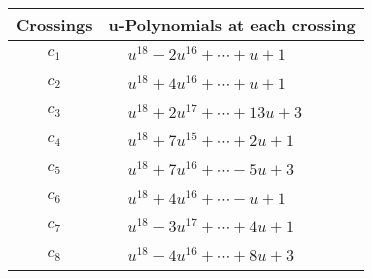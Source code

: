 \documentclass[1p]{elsarticle_modified}
\theoremstyle{definition}
\begin{document}
\begin{tabular}{m{50pt}|m{274pt}}
Crossings & \hspace{64pt}u-Polynomials at each crossing \\
\hline $$\begin{aligned}c_{1}\end{aligned}$$&$\begin{aligned}
&u^{18}-2 u^{16}+\cdots+u+1
\end{aligned}$\\
\hline $$\begin{aligned}c_{2}\end{aligned}$$&$\begin{aligned}
&u^{18}+4 u^{16}+\cdots+u+1
\end{aligned}$\\
\hline $$\begin{aligned}c_{3}\end{aligned}$$&$\begin{aligned}
&u^{18}+2 u^{17}+\cdots+13 u+3
\end{aligned}$\\
\hline $$\begin{aligned}c_{4}\end{aligned}$$&$\begin{aligned}
&u^{18}+7 u^{15}+\cdots+2 u+1
\end{aligned}$\\
\hline $$\begin{aligned}c_{5}\end{aligned}$$&$\begin{aligned}
&u^{18}+7 u^{16}+\cdots-5 u+3
\end{aligned}$\\
\hline $$\begin{aligned}c_{6}\end{aligned}$$&$\begin{aligned}
&u^{18}+4 u^{16}+\cdots- u+1
\end{aligned}$\\
\hline $$\begin{aligned}c_{7}\end{aligned}$$&$\begin{aligned}
&u^{18}-3 u^{17}+\cdots+4 u+1
\end{aligned}$\\
\hline $$\begin{aligned}c_{8}\end{aligned}$$&$\begin{aligned}
&u^{18}-4 u^{16}+\cdots+8 u+3
\end{aligned}$\\

\end{tabular}
\end{document}
